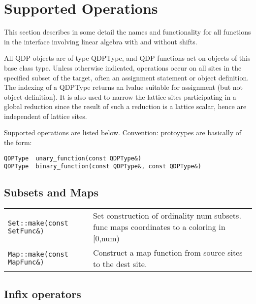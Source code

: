 \documentclass[12pt,letterpaper]{article}
\begin{document}
\newpage

\section{Supported Operations}
\label{sec:supported}

This section describes in some detail the names and functionality for
all functions in the interface involving linear algebra with and
without shifts.  

All QDP objects are of type QDPType, and QDP functions act on objects
of this base class type. Unless otherwise indicated, operations occur
on all sites in the specified subset of the target, often an
assignment statement or object definition. The indexing of a QDPType
returns an lvalue suitable for assignment (but not object
definition). It is also used to narrow the lattice sites participating
in a global reduction since the result of such a reduction is a
lattice scalar, hence are independent of lattice sites.

Supported operations are listed below.
Convention: protoyypes are basically of the form:

\begin{verbatim}
QDPType  unary_function(const QDPType&)
QDPType  binary_function(const QDPType&, const QDPType&)
\end{verbatim}

\medskip

\subsection{Subsets and Maps}
\label{sec:subsets}

\begin{flushleft}
\begin{tabular}{lp{4.0in}}
{\tt Set::make(const SetFunc\&)} & Set construction of ordinality num subsets.
                               func maps coordinates to a coloring in [0,num)\\

{\tt Map::make(const MapFunc\&)} & Construct a map function from source sites to the dest site.\\
\end{tabular}
\end{flushleft}

\medskip

\subsection{Infix operators}
\label{sec:infix}
\end{document}
